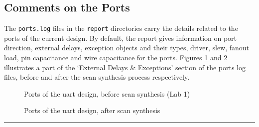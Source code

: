 \documentclass[a4paper,11pt]{article}%
\begin{document}
\pagebreak
\subsection{Comments on the Ports}



The {\tt ports.log} files in the {\tt report} directories carry the details related to the ports of the current design. By default, the report gives information on port direction, external delays, exception objects and their types, driver, slew, fanout load, pin capacitance and wire capacitance for the ports\cite{genus_command_ref_2019}. Figures \ref{fig:ports_lab1} and \ref{fig:ports_after_scan_synthesis} illustrates a part of the `External Delays \& Exceptions' section of the ports log files, before and after the scan synthesis process respectively.

\begin{figure}[h]
	\centering
	\caption{Ports of the \ac{uart} design, before scan synthesis (Lab 1)}
	\label{fig:ports_lab1}
\end{figure}

\begin{figure}[h]
	\centering
	\caption{Ports of the \ac{uart} design, after scan synthesis}
	\label{fig:ports_after_scan_synthesis}
\end{figure}

\pagebreak
\vfill
\hrule
{\small


}
\end{document}
